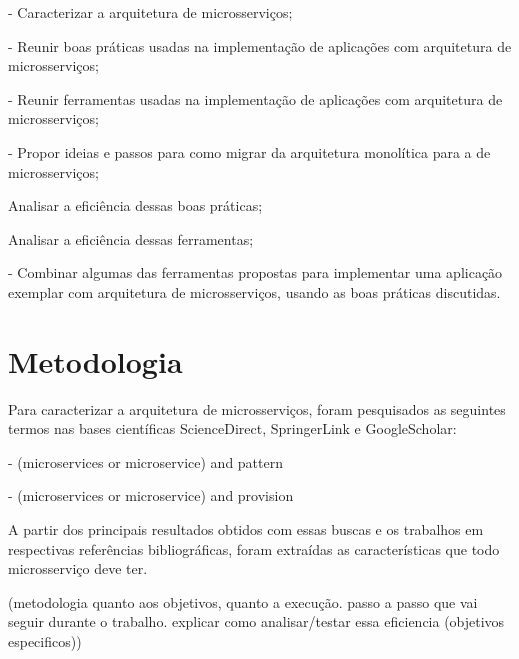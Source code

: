 - Caracterizar a arquitetura de microsserviços;

- Reunir boas práticas usadas na implementação de aplicações com arquitetura de microsserviços;

- Reunir ferramentas usadas na implementação de aplicações com arquitetura de microsserviços;

- Propor ideias e passos para como migrar da arquitetura monolítica para a de microsserviços;

Analisar a eficiência dessas boas práticas;

Analisar a eficiência dessas ferramentas;

- Combinar algumas das ferramentas propostas para implementar uma aplicação exemplar com arquitetura de microsserviços, usando as boas práticas discutidas.

\section{Metodologia}

Para caracterizar a arquitetura de microsserviços, foram pesquisados as seguintes termos nas bases científicas ScienceDirect, SpringerLink e GoogleScholar:

- (microservices or microservice) and pattern

- (microservices or microservice) and provision

A partir dos principais resultados obtidos com essas buscas e os trabalhos em respectivas referências bibliográficas, foram extraídas as características que todo microsserviço deve ter.

(metodologia quanto aos objetivos, quanto a execução. passo a passo que vai seguir durante o trabalho. explicar como analisar/testar essa eficiencia (objetivos especificos))